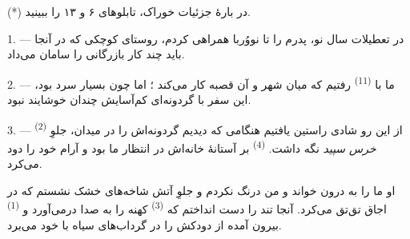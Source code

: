 %

(*) در بارهٔ جزئیات خوراک، تابلوهای ۶ و ۱۳ را ببینید.

\VUsaut{4.0mm}
\VUsaut{3.0mm}
\VUfilet{16mm}
\VUsaut{5.6mm}
\VUsaut{3.0mm}

\VUsaut{3.0mm}
\VUsaut{3.0mm}

\VUsaut{4.0mm}
\VUsaut{4.0mm}

1. --- در تعطیلات سال نو، پدرم را تا نووُربا همراهی کردم، روستای کوچکی
که در آنجا باید چند کار بازرگانی را سامان می‌داد.

2. --- ما با  \textsuperscript{(11)} رفتیم که میان شهر و
آن قصبه کار می‌کند ؛ اما چون بسیار سرد بود، این سفر با گردونه‌ای کم‌آسایش
چندان خوشایند نبود.

3. --- از این رو شادی راستین یافتیم هنگامی که دیدیم 
گردونه‌اش را در میدان، جلوِ  \textsuperscript{(2)}
\textit{خرس سپید} نگه داشت. 
\textsuperscript{(4)} بر آستانهٔ خانه‌اش در انتظار ما بود و آرام
 خود را دود می‌کرد.

او ما را به درون خواند و من درنگ نکردم و جلوِ آتش شاخه‌های خشک نشستم که
در اجاق تق‌تق می‌کرد. آنجا  تند را دست انداختم که
 \textsuperscript{(3)} کهنه را به صدا درمی‌آورد و
 \textsuperscript{(1)} بیرون آمده از دودکش را در گرداب‌های
سیاه با خود می‌برد.

